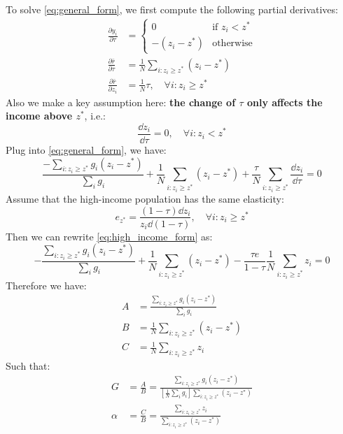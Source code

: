 To solve \eqref{eq:general_form}, we first compute the following partial derivatives:
\begin{align*}
    \frac{\partial y_i}{\partial \tau} &= \begin{cases}
      0 & \text{if $z_i < z^*$}\\
      - (z_i-z^*) & \text{otherwise}
    \end{cases} \\
    \frac{\partial \bar{r}}{\partial \tau} &= \frac{1}{N}\sum_{i:z_i\geq z^*}(z_i-z^*) \\
    \frac{\partial \bar{r}}{\partial z_i} &= \frac{1}{N}\tau, \quad \forall i: z_i \geq z^*
\end{align*}
Also we make a key assumption here: \textbf{the change of $\tau$ only affects the income above $z^*$}, i.e.:
\begin{equation*}
    \frac{\dd z_i}{\dd \tau} = 0, \quad \forall i: z_i < z^* 
\end{equation*}
Plug into \eqref{eq:general_form}, we have:
\begin{equation} \label{eq:high_income_form}
    \frac{-\sum_{i:z_i\geq z^*} g_i(z_i-z^*)}{\sum_i g_i}  +  \frac{1}{N}\sum_{i:z_i\geq z^*}(z_i-z^*) + \frac{\tau}{N}\sum_{i:z_i\geq z^*} \frac{\dd z_i}{\dd \tau} = 0
\end{equation}
Assume that the high-income population has the same elasticity:
\begin{equation*}
    e_{z^*} = \frac{(1-\tau)\dd z_i}{z_i\dd(1-\tau)}, \quad \forall i: z_i \geq z^*
\end{equation*}
Then we can rewrite \eqref{eq:high_income_form} as:
\begin{equation*} 
    -\frac{\sum_{i:z_i\geq z^*} g_i(z_i-z^*)}{\sum_i g_i}  +  \frac{1}{N}\sum_{i:z_i\geq z^*} (z_i-z^*) - \frac{\tau e}{1-\tau}\frac{1}{N}\sum_{i:z_i\geq z^*} z_i = 0
\end{equation*}
Therefore we have:
\begin{align*}
    A &= \frac{\sum_{i:z_i\geq z^*} g_i(z_i-z^*)}{\sum_i g_i} \\
    B &= \frac{1}{N}\sum_{i:z_i\geq z^*} (z_i-z^*) \\
    C &= \frac{1}{N}\sum_{i:z_i\geq z^*} z_i
\end{align*}
Such that:
\begin{align*}
    G &= \frac{A}{B} = \frac{\sum_{i:z_i\geq z^*} g_i(z_i-z^*)}{\left [\frac{1}{N}\sum_i g_i\right ] \sum_{i:z_i\geq z^*} (z_i-z^*)} \\
    \alpha &= \frac{C}{B} = \frac{\sum_{i:z_i\geq z^*} z_i}{\sum_{i:z_i\geq z^*} (z_i-z^*)}
\end{align*}

